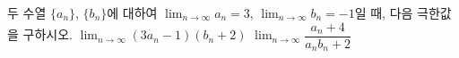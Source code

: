 두 수열 $\{a_n\}$, $\{b_n\}$에 대하여 $\displaystyle\lim_{n\to\infty}a_n=3$, $\displaystyle\lim_{n\to\infty}b_n=-1$일 때, 다음 극한값을 구하시오.
 $\displaystyle\lim_{n\to\infty}(3a_n-1)(b_n+2)$
 $\displaystyle\lim_{n\to\infty}\dfrac{a_n+4}{a_nb_n+2}$
